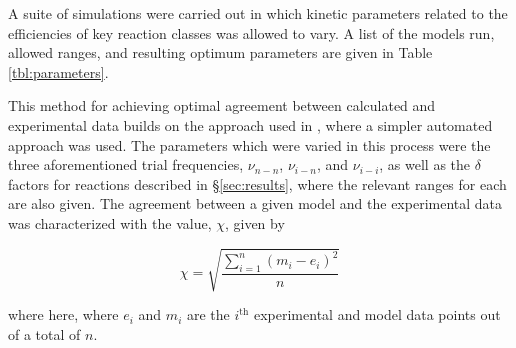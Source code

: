 \documentclass[journal=aesccq,manuscript=draft]{achemso}
\begin{document}
A suite of simulations were carried out in which kinetic parameters related to the efficiencies of key reaction classes was allowed to vary. A list of the models run, allowed ranges, and resulting optimum parameters are given in Table \ref{tbl:parameters}.

This method for achieving optimal agreement between calculated and experimental data builds on the approach used in \citet{mullikin_new_2021}, where a simpler automated approach was used. The parameters which were varied in this process were the three aforementioned trial frequencies, $\nu_{n-n}$, $\nu_{i-n}$, and $\nu_{i-i}$, as well as the $\delta$ factors for reactions described in \S\ref{sec:results}, where the relevant ranges for each are also given. The agreement between a given model and the experimental data was characterized with the value, $\chi$, given by

\begin{equation}
    \chi = \sqrt{\frac{\sum_{i=1}^{n} (m_i - e_i)^2}{n}}
\end{equation}

\noindent
where here, where $e_i$ and $m_i$ are the $i^{\textrm{th}}$ experimental and model data points out of a total of $n$.
\end{document}
